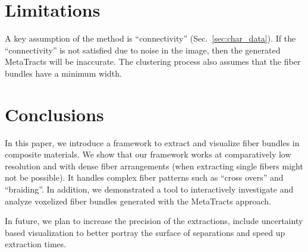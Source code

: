\section{Limitations}
A key assumption of the method is ``connectivity'' (Sec.~\ref{sec:char_data}).
If the ``connectivity'' is not satisfied due to noise in the image, then the  generated MetaTracts will be inaccurate. 
The clustering process also assumes that the fiber bundles have a minimum width.
\section{Conclusions}
In this paper, we introduce a framework to extract and visualize fiber bundles in composite materials. We show that our framework works at comparatively low resolution and with dense fiber arrangements (when extracting single fibers might not be possible). It handles complex fiber patterns such as ``cross overs'' and ``braiding''.
In addition, we demonstrated a tool to interactively investigate and analyze voxelized fiber bundles generated with the MetaTracts approach.

In future, we plan to increase the precision of the extractions, include uncertainty based visualization to better portray the surface of separations and speed up extraction times.
